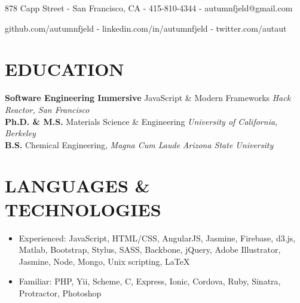 \documentclass[11pt]{res} %
\newcommand{\myrule} [3] []{
    \begin{center}
        \begin{tikzpicture}
        \hspace{-6pt}
            \draw[#2-#3, thick, #1] (0,0) to (\linewidth,0);
        \end{tikzpicture}
    \end{center}
}
\newcommand\details[1]{\vspace{-21pt}\color{AutGreen}\begin{center}\small{#1}\end{center}\vspace{-14pt}}
\begin{document}
 
\thispagestyle{plain}
\vspace{-50pt}
 \name{ {\sc {\LARGE \color{AutGreen} {\sc Autumn Fjeld}}} \\[2pt]} %


\begin{resume}
\details{878 Capp Street - San Francisco, CA - 415-810-4344 - autumnfjeld@gmail.com }
\vspace{2pt}
\details{  github.com/autumnfjeld - linkedin.com/in/autumnfjeld - twitter.com/autaut }
\vspace{-32pt}
\color{AutGreen}{  \myrule{o}{o} }
\color{DarkGray}
\vspace{-10pt}  
\section{EDUCATION} 
\vspace{4pt}
 \textbf{  Software Engineering Immersive} JavaScript \& Modern Frameworks \hfill {\it Hack Reactor, San Francisco} \\
 \textbf{ Ph.D. \& M.S.} Materials Science \& Engineering   \hfill {\it University of California, Berkeley} \\
 \textbf{ B.S.} Chemical Engineering, {\it Magna Cum Laude} \hfill {\it Arizona State University } 

\section{LANGUAGES \& TECHNOLOGIES}
\begin{itemize} \itemsep -1pt 
  \item Experienced: JavaScript, HTML/CSS, AngularJS, Jasmine, Firebase, d3.js, Matlab, Bootstrap, Stylus, SASS, Backbone, jQuery, Adobe Illustrator, Jasmine, Node, Mongo, Unix scripting, {\fontfamily{}\selectfont \LaTeX }
  \item Familiar:  PHP, Yii, Scheme, C, Express, Ionic, Cordova, Ruby, Sinatra, Protractor, Photoshop 
\end{itemize}
%

\end{resume}
\end{document}
